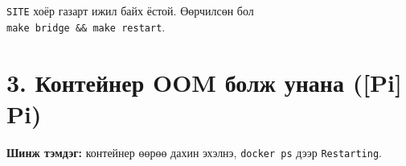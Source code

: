 \texttt{SITE} хоёр газарт ижил байх ёстой. Өөрчилсөн бол \texttt{make\ bridge\ \&\allowbreak{}\&\allowbreak{}\ make\ restart}.

\hypertarget{ux43aux43eux43dux442ux435ux439ux43dux435ux440-oom-ux431ux43eux43bux436-ux443ux43dux430ux43dux430-pi-pi}{%
\section{3. Контейнер OOM болж унана ({[}Pi{]} Pi)}\label{ux43aux43eux43dux442ux435ux439ux43dux435ux440-oom-ux431ux43eux43bux436-ux443ux43dux430ux43dux430-pi-pi}}

\textbf{Шинж тэмдэг:} контейнер өөрөө дахин эхэлнэ, \texttt{docker\ ps} дээр \texttt{Restarting}.

\begin{Shaded}
\begin{Highlighting}[]
 \KeywordTok{|}  \KeywordTok{|} 
\end{Highlighting}
\end{Shaded}

